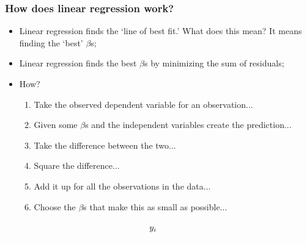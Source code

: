 \documentclass[aspectratio=169]{beamer}
\theoremstyle{principle}
\begin{document}
\begin{frame}
\frametitle{How does linear regression work?}

\begin{itemize}
\item Linear regression finds the `line of best fit.'  What does this mean?  It means finding the `best' $\beta$s;
\bigskip

\item Linear regression finds the best $\beta$s by minimizing the sum of residuals;
\bigskip

\item How?
\begin{enumerate}
\item Take the observed dependent variable for an observation...
\item[]\color{white} Given some $\beta$s and the independent variables create the prediction...
\item[]\color{white} Take the difference between the two...
\item[]\color{white} Square the difference...
\item[]\color{white} Add it up for all the observations in the data...
\item[]\color{white} Choose the $\beta$s that make this as small as possible...
\end{enumerate}
\begin{align*}
\color{white}\min_{\beta_0,\beta_1}\sum_i(\color{black}y_i\color{white} - (\beta_0 + \beta_1 x_i))^2
\end{align*}
\end{itemize}

\end{frame}
\end{document}

